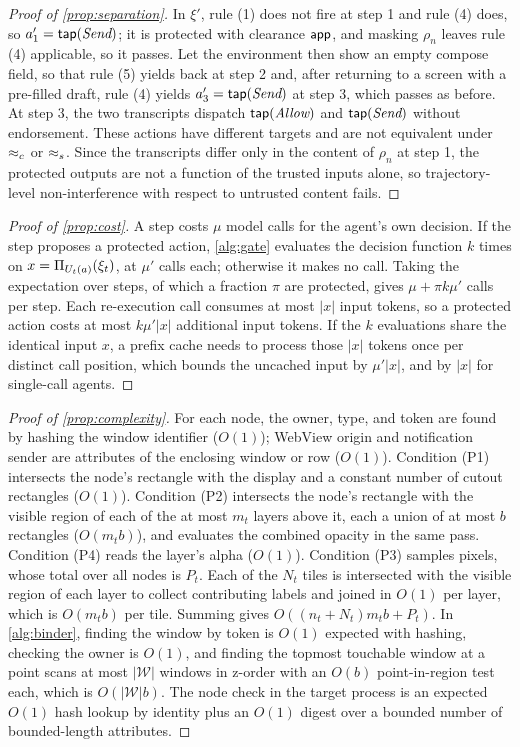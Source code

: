 \begin{proof}[Proof of \cref{prop:separation}]
In $\xi'$, rule (1) does not fire at step 1 and rule (4) does, so $a'_1=\textsf{tap}(\emph{Send})$; it is protected with clearance $\textsf{app}$, and masking $\rho_n$ leaves rule (4) applicable, so it passes. Let the environment then show an empty compose field, so that rule (5) yields \textsf{back} at step 2 and, after returning to a screen with a pre-filled draft, rule (4) yields $a'_3=\textsf{tap}(\emph{Send})$ at step 3, which passes as before. At step 3, the two transcripts dispatch $\textsf{tap}(\emph{Allow})$ and $\textsf{tap}(\emph{Send})$ without endorsement. These actions have different targets and are not equivalent under $\approx_c$ or $\approx_s$. Since the transcripts differ only in the content of $\rho_n$ at step 1, the protected outputs are not a function of the trusted inputs alone, so trajectory-level non-interference with respect to untrusted content fails.
\end{proof}

\begin{proof}[Proof of \cref{prop:cost}]
A step costs $\mu$ model calls for the agent's own decision. If the step proposes a protected action, \cref{alg:gate} evaluates the decision function $k$ times on $x=\Pi_{U_t(a)}(\xi_t)$, at $\mu'$ calls each; otherwise it makes no call. Taking the expectation over steps, of which a fraction $\pi$ are protected, gives $\mu+\pi k\mu'$ calls per step. Each re-execution call consumes at most $|x|$ input tokens, so a protected action costs at most $k\mu'|x|$ additional input tokens. If the $k$ evaluations share the identical input $x$, a prefix cache needs to process those $|x|$ tokens once per distinct call position, which bounds the uncached input by $\mu'|x|$, and by $|x|$ for single-call agents.
\end{proof}

\begin{proof}[Proof of \cref{prop:complexity}]
For each node, the owner, type, and token are found by hashing the window identifier ($O(1)$); WebView origin and notification sender are attributes of the enclosing window or row ($O(1)$). Condition (P1) intersects the node's rectangle with the display and a constant number of cutout rectangles ($O(1)$). Condition (P2) intersects the node's rectangle with the visible region of each of the at most $m_t$ layers above it, each a union of at most $b$ rectangles ($O(m_tb)$), and evaluates the combined opacity in the same pass. Condition (P4) reads the layer's alpha ($O(1)$). Condition (P3) samples pixels, whose total over all nodes is $P_t$. Each of the $N_t$ tiles is intersected with the visible region of each layer to collect contributing labels and joined in $O(1)$ per layer, which is $O(m_tb)$ per tile. Summing gives $O((n_t+N_t)m_tb+P_t)$. In \cref{alg:binder}, finding the window by token is $O(1)$ expected with hashing, checking the owner is $O(1)$, and finding the topmost touchable window at a point scans at most $|\mathcal{W}|$ windows in z-order with an $O(b)$ point-in-region test each, which is $O(|\mathcal{W}|b)$. The node check in the target process is an expected $O(1)$ hash lookup by identity plus an $O(1)$ digest over a bounded number of bounded-length attributes.
\end{proof}
